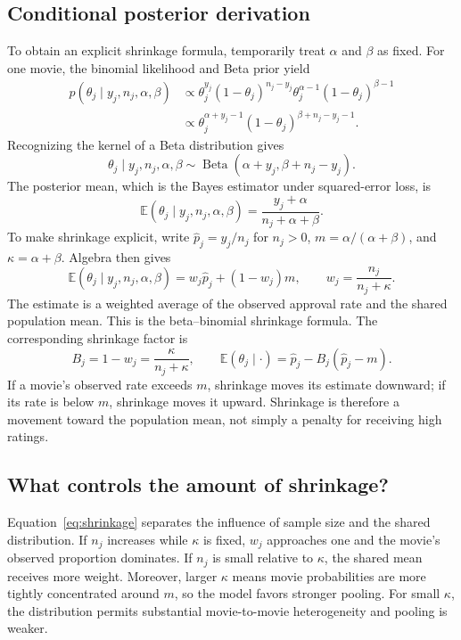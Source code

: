 \documentclass[11pt,a4paper]{article}
\newcommand{\E}{\mathbb{E}}
\newcommand{\BetaD}{\operatorname{Beta}}
\begin{document}
\subsection{Conditional posterior derivation}
To obtain an explicit shrinkage formula, temporarily treat $\alpha$ and $\beta$ as fixed. For one movie, the binomial likelihood and Beta prior yield
\begin{align}
 p(\theta_j\mid y_j,n_j,\alpha,\beta)
 &\propto \theta_j^{y_j}(1-\theta_j)^{n_j-y_j}
 \theta_j^{\alpha-1}(1-\theta_j)^{\beta-1}\\
 &\propto\theta_j^{\alpha+y_j-1}
 (1-\theta_j)^{\beta+n_j-y_j-1}.
\end{align}
Recognizing the kernel of a Beta distribution gives
\begin{equation}
 \boxed{\theta_j\mid y_j,n_j,\alpha,\beta
 \sim\BetaD(\alpha+y_j,\beta+n_j-y_j).}
 \label{eq:conditional-posterior}
\end{equation}
The posterior mean, which is the Bayes estimator under squared-error loss, is
\begin{equation}
 \E(\theta_j\mid y_j,n_j,\alpha,\beta)
 =\frac{y_j+\alpha}{n_j+\alpha+\beta}.
 \label{eq:posterior-mean}
\end{equation}
To make shrinkage explicit, write $\widehat p_j=y_j/n_j$ for $n_j>0$, $m=\alpha/(\alpha+\beta)$, and $\kappa=\alpha+\beta$. Algebra then gives
\begin{equation}
 \boxed{\E(\theta_j\mid y_j,n_j,\alpha,\beta)
 =w_j\widehat p_j+(1-w_j)m,\qquad
 w_j=\frac{n_j}{n_j+\kappa}.}
 \label{eq:shrinkage}
\end{equation}
The estimate is a weighted average of the observed approval rate and the shared population mean. This is the beta--binomial shrinkage formula. The corresponding shrinkage factor is
\begin{equation}
 B_j=1-w_j=\frac{\kappa}{n_j+\kappa},\qquad
 \E(\theta_j\mid\cdot)=\widehat p_j-B_j(\widehat p_j-m).
 \label{eq:shrinkage-factor}
\end{equation}
If a movie's observed rate exceeds $m$, shrinkage moves its estimate downward; if its rate is below $m$, shrinkage moves it upward. Shrinkage is therefore a movement toward the population mean, not simply a penalty for receiving high ratings.

\subsection{What controls the amount of shrinkage?}
Equation~\eqref{eq:shrinkage} separates the influence of sample size and the shared distribution. If $n_j$ increases while $\kappa$ is fixed, $w_j$ approaches one and the movie's observed proportion dominates. If $n_j$ is small relative to $\kappa$, the shared mean receives more weight. Moreover, larger $\kappa$ means movie probabilities are more tightly concentrated around $m$, so the model favors stronger pooling. For small $\kappa$, the distribution permits substantial movie-to-movie heterogeneity and pooling is weaker.
\end{document}
